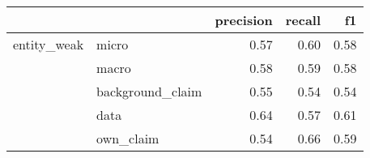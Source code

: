 \begin{tabular}{llrrr}
\toprule
            &           &  precision &  recall &   f1 \\
\midrule
entity\_weak & micro &       0.57 &    0.60 & 0.58 \\
            & macro &       0.58 &    0.59 & 0.58 \\
            & background\_claim &       0.55 &    0.54 & 0.54 \\
            & data &       0.64 &    0.57 & 0.61 \\
            & own\_claim &       0.54 &    0.66 & 0.59 \\
\bottomrule
\end{tabular}
